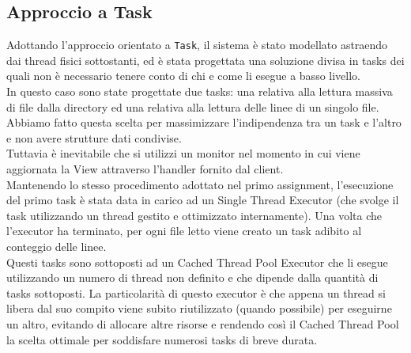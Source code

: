 \documentclass{article}
\begin{document}
    \subsection{Approccio a Task}
    Adottando l’approccio orientato a \texttt{Task}, il sistema è stato modellato astraendo dai thread fisici sottostanti, ed è stata progettata una soluzione divisa in tasks dei quali non è necessario tenere conto di chi e come li esegue a basso livello.
    \\
    In questo caso sono state progettate due tasks: una relativa alla lettura massiva di file dalla directory ed una relativa alla lettura delle linee di un singolo file.
    Abbiamo fatto questa scelta per massimizzare l’indipendenza tra un task e l'altro e non avere strutture dati condivise.
    \\
    Tuttavia è inevitabile che si utilizzi un monitor nel momento in cui viene aggiornata la View attraverso l'handler fornito dal client.
    \\
    Mantenendo lo stesso procedimento adottato nel primo assignment, l’esecuzione del primo task è stata data in carico ad un Single Thread Executor (che svolge il task utilizzando un thread gestito e ottimizzato internamente).
    Una volta che l’executor ha terminato, per ogni file letto viene creato un task adibito al conteggio delle linee.
    \\
    Questi tasks sono sottoposti ad un Cached Thread Pool Executor che li esegue utilizzando un numero di thread non definito e che dipende dalla quantità di tasks sottoposti. La particolarità di questo executor è che appena un thread si libera dal suo compito viene subito riutilizzato (quando possibile) per eseguirne un altro, evitando di allocare altre risorse e rendendo così il Cached Thread Pool la scelta ottimale per soddisfare numerosi tasks di breve durata.
\end{document}
